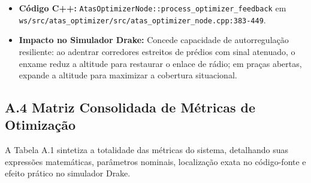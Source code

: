 \documentclass[
  brazilian,
  a4paper]{article}
\providecommand{\tightlist}{%
  \setlength{\itemsep}{0pt}\setlength{\parskip}{0pt}}
\begin{document}
\begin{itemize}
\tightlist
\item
  \textbf{Código C++:}
  \texttt{AtasOptimizerNode:\allowbreak{}:\allowbreak{}process\_\allowbreak{}optimizer\_\allowbreak{}feedback} em
  \texttt{ws/\allowbreak{}src/\allowbreak{}atas\_\allowbreak{}optimizer/\allowbreak{}src/\allowbreak{}atas\_\allowbreak{}optimizer\_\allowbreak{}node.\allowbreak{}cpp:\allowbreak{}383-449}.
\item
  \textbf{Impacto no Simulador Drake:} Concede capacidade de
  autorregulação resiliente: ao adentrar corredores estreitos de prédios
  com sinal atenuado, o enxame reduz a altitude para restaurar o enlace
  de rádio; em praças abertas, expande a altitude para maximizar a
  cobertura situacional.
\end{itemize}

\subsection{A.4 Matriz Consolidada de Métricas de
Otimização}\label{a.4-matriz-consolidada-de-muxe9tricas-de-otimizauxe7uxe3o}

A Tabela A.1 sintetiza a totalidade das métricas do sistema, detalhando
suas expressões matemáticas, parâmetros nominais, localização exata no
código-fonte e efeito prático no simulador Drake.
\end{document}

